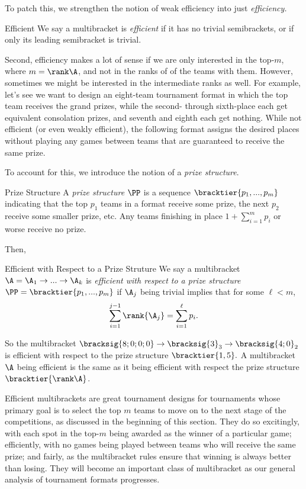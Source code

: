 {    To patch this, we strengthen the notion of weak efficiency into just \textit{efficiency.}

    \begin{definition}{Efficient}{}
        We say a multibracket is \textit{efficient} if it has no trivial semibrackets, or if only its leading semibracket is trivial.
    \end{definition}

    Second, efficiency makes a lot of sense if we are only interested in the top-$m$, where $m = \rank\A$, and not in the ranks of of the teams with them. However, sometimes we might be interested in the intermediate ranks as well. For example, let's see we want to design an eight-team tournament format in which the top team receives the grand prizes, while the second- through sixth-place each get equivalent consolation prizes, and seventh and eighth each get nothing. While not efficient (or even weakly efficient), the following format assigns the desired places without playing any games between teams that are guaranteed to receive the same prize.


    To account for this, we introduce the notion of a \textit{prize structure}.
    
    \begin{definition}{Prize Structure}{}
        A \textit{prize structure} $\PP$ is a sequence $\bracktier{p_1, ..., p_m}$ indicating that the top $p_1$ teams in a format receive some prize, the next $p_2$ receive some smaller prize, etc. Any teams finishing in place $1 + \sum_{i=1}^m p_i$ or worse receive no prize.
    \end{definition}

    Then,

    \begin{definition}{Efficient with Respect to a Prize Struture}{}
        We say a multibracket $\A = \A_1 \to ... \to \A_k$ is \textit{efficient with respect to a prize structure} $\PP = \bracktier{p_1, ..., p_m}$ if $\A_j$ being trivial implies that for some $\ell < m$, $$\sum_{i=1}^{j-1} \rank {\A_j} = \sum_{i=1}^\ell p_i.$$
    \end{definition}

    So the multibracket $\bracksig{8;0;0;0} \to \bracksig{3}_3 \to \bracksig{4;0}_2$ is efficient with respect to the prize structure $\bracktier{1, 5}.$ A multibracket $\A$ being efficient is the same as it being efficient with respect the prize structure $\bracktier{\rank\A}$.

    Efficient multibrackets are great tournament designs for tournaments whose primary goal is to select the top $m$ teams to move on to the next stage of the competitions, as discussed in the beginning of this section. They do so excitingly, with each spot in the top-$m$ being awarded as the winner of a particular game; efficiently, with no games being played between teams who will receive the same prize; and fairly, as the multibracket rules ensure that winning is always better than losing. They will become an important class of multibracket as our general analysis of tournament formats progresses.
}